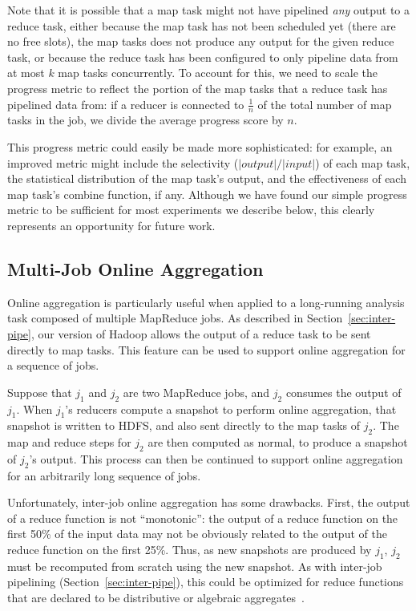 Note that it is possible that a map task might not have pipelined
\emph{any} output to a reduce task, either because the map task has
not been scheduled yet (there are no free {\TT} slots), the map tasks does 
not produce any output for the given reduce task, or because the reduce task has 
been configured to only pipeline data from at most $k$ map tasks concurrently. 
To account for this, we need to scale the progress metric to reflect the portion 
of the map tasks that a reduce task has pipelined data from: if a reducer is 
connected to $\frac{1}{n}$ of the total number of map tasks in the job, we divide
the average progress score by $n$.

This progress metric could easily be made more sophisticated: for example, an
improved metric might include the selectivity ($|output|/|input|$) of each map task, the
statistical distribution of the map task's output, and the effectiveness of each
map task's combine function, if any. 
Although we have found our simple progress metric to be
sufficient for most experiments we describe below, this clearly
represents an opportunity for future work.

\subsection{Multi-Job Online Aggregation}
\label{sec:online-multi}

Online aggregation is particularly useful when applied to a long-running
analysis task composed of multiple MapReduce jobs.  As described in
Section~\ref{sec:inter-pipe}, our version of Hadoop allows the output of a
reduce task to be sent directly to map tasks. This feature can be used to
support online aggregation for a sequence of jobs.

Suppose that $j_1$ and $j_2$ are two MapReduce jobs, and $j_2$
consumes the output of $j_1$. When $j_1$'s reducers compute a snapshot
to perform online aggregation, that snapshot is written to HDFS, and
also sent directly to the map tasks of $j_2$. The map and reduce steps
for $j_2$ are then computed as normal, to produce a snapshot of
$j_2$'s output. This process can then be continued to support online
aggregation for an arbitrarily long sequence of jobs.
  
Unfortunately, inter-job online aggregation has some drawbacks. First,
the output of a reduce function is not ``monotonic'': the output of a
reduce function on the first 50\% of the input data may not be
obviously related to the output of the reduce function on the first
25\%. Thus, as new snapshots are produced by $j_1$, $j_2$ must be
recomputed from scratch using the new snapshot. As with inter-job
pipelining (Section~\ref{sec:inter-pipe}), this could be optimized for
reduce functions that are declared to be distributive or algebraic
aggregates~\cite{datacube}.

